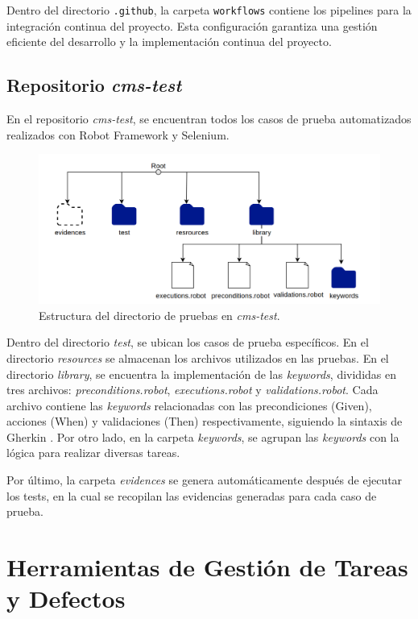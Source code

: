 Dentro del directorio \texttt{.github}, la carpeta \texttt{workflows} contiene los pipelines para la integración continua del proyecto. Esta configuración garantiza una gestión eficiente del desarrollo y la implementación continua del proyecto.


\subsection{Repositorio \textit{cms-test}}
En el repositorio \textit{cms-test}, se encuentran todos los casos de prueba automatizados realizados con Robot Framework y Selenium.

\begin{figure}[H]
\centering
\includegraphics[width=0.9\linewidth]{fig/test-directory.png}
\caption{Estructura del directorio de pruebas en \textit{cms-test}.}
\label{fig:test-directory}
\end{figure}

Dentro del directorio \textit{test}, se ubican los casos de prueba específicos. En el directorio \textit{resources} se almacenan los archivos utilizados en las pruebas. En el directorio \textit{library}, se encuentra la implementación de las \textit{keywords}, divididas en tres archivos: \textit{preconditions.robot}, \textit{executions.robot} y \textit{validations.robot}. Cada archivo contiene las \textit{keywords} relacionadas con las precondiciones (Given), acciones (When) y validaciones (Then) respectivamente, siguiendo la sintaxis de Gherkin \cite{gherkin_docs}.
Por otro lado, en la carpeta \textit{keywords}, se agrupan las \textit{keywords} con la lógica para realizar diversas tareas.

Por último, la carpeta \textit{evidences} se genera automáticamente después de ejecutar los tests, en la cual se recopilan las evidencias generadas para cada caso de prueba.

\section{Herramientas de Gestión de Tareas y Defectos}

